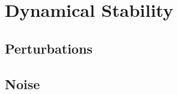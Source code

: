 
\chapter{Dynamical Stability}
\label{chap:dynamicalStability}
%

\section{Perturbations}

\section{Noise}
